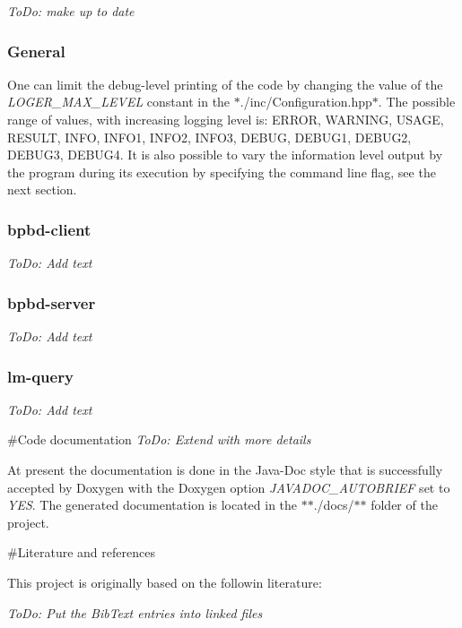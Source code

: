 {\itshape To\+Do\+: make up to date}

\subsubsection*{General}

One can limit the debug-\/level printing of the code by changing the value of the {\itshape L\+O\+G\+E\+R\+\_\+\+M\+A\+X\+\_\+\+L\+E\+V\+E\+L} constant in the $\ast$./inc/\+Configuration.hpp$\ast$. The possible range of values, with increasing logging level is\+: E\+R\+R\+O\+R, W\+A\+R\+N\+I\+N\+G, U\+S\+A\+G\+E, R\+E\+S\+U\+L\+T, I\+N\+F\+O, I\+N\+F\+O1, I\+N\+F\+O2, I\+N\+F\+O3, D\+E\+B\+U\+G, D\+E\+B\+U\+G1, D\+E\+B\+U\+G2, D\+E\+B\+U\+G3, D\+E\+B\+U\+G4. It is also possible to vary the information level output by the program during its execution by specifying the command line flag, see the next section.

\subsubsection*{bpbd-\/client}

{\itshape To\+Do\+: Add text} \subsubsection*{bpbd-\/server}

{\itshape To\+Do\+: Add text} \subsubsection*{lm-\/query}

{\itshape To\+Do\+: Add text}

\#\+Code documentation {\itshape To\+Do\+: Extend with more details}

At present the documentation is done in the Java-\/\+Doc style that is successfully accepted by Doxygen with the Doxygen option {\itshape J\+A\+V\+A\+D\+O\+C\+\_\+\+A\+U\+T\+O\+B\+R\+I\+E\+F} set to {\itshape Y\+E\+S}. The generated documentation is located in the $\ast$$\ast$./docs/$\ast$$\ast$ folder of the project.

\#\+Literature and references

This project is originally based on the followin literature\+:

{\itshape To\+Do\+: Put the Bib\+Text entries into linked files}

